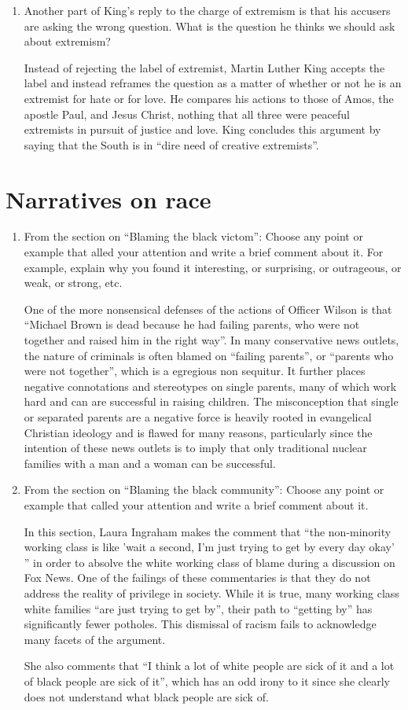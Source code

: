 \documentclass{article}
\begin{document}
\begin{enumerate}
  \item Another part of King's reply to the charge of extremism is that his accusers are asking the wrong question. What is the question he thinks we should ask about extremism?
  \par Instead of rejecting the label of extremist, Martin Luther King accepts the label and instead reframes the question as a matter of whether or not he is an extremist for hate or for love. He compares his actions to those of Amos, the apostle Paul, and Jesus Christ, nothing that all three were peaceful extremists in pursuit of justice and love. King concludes this argument by saying that the South is in ``dire need of creative extremists''.
\end{enumerate}

\section*{Narratives on race}
\begin{enumerate}
  \item From the section on ``Blaming the black victom'': Choose any point or example that alled your attention and write a brief comment about it. For example, explain why you found it interesting, or surprising, or outrageous, or weak, or strong, etc.
  \par One of the more nonsensical defenses of the actions of Officer Wilson is that ``Michael Brown is dead because he had failing parents, who were not together and raised him in the right way''. In many conservative news outlets, the nature of criminals is often blamed on ``failing parents'', or ``parents who were not together'', which is a egregious non sequitur. It further places negative connotations and stereotypes on single parents, many of which work hard and can are successful in raising children. The misconception that single or separated parents are a negative force is heavily rooted in evangelical Christian ideology and is flawed for many reasons, particularly since the intention of these news outlets is to imply that only traditional nuclear families with a man and a woman can be successful.
  \item From the section on ``Blaming the black community'': Choose any point or example that called your attention and write a brief comment about it.
  \par In this section, Laura Ingraham makes the comment that ``the non-minority working class is like 'wait a second, I'm just trying to get by every day okay' '' in order to absolve the white working class of blame during a discussion on Fox News. One of the failings of these commentaries is that they do not address the reality of privilege in society. While it is true, many working class white families ``are just trying to get by'', their path to ``getting by'' has significantly fewer potholes. This dismissal of racism fails to acknowledge many facets of the argument.
  \par She also comments that ``I think a lot of white people are sick of it and a lot of black people are sick of it'', which has an odd irony to it since she clearly does not understand what black people are sick of.
\end{enumerate}
\end{document}
